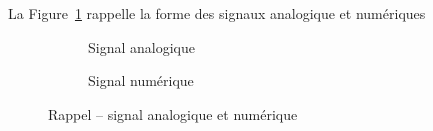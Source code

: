 La Figure~\ref{fig:analogVsNum} rappelle la forme des signaux analogique et numériques

\begin{figure}[ht]
\centering
\begin{subfigure}{0.49\textwidth}
\centering
	
	\caption{Signal analogique}
\end{subfigure}%
%
\begin{subfigure}{0.49\textwidth}
\centering
	
	\caption{Signal numérique}
\end{subfigure}
%
	\caption{Rappel -- signal analogique et numérique}
	\label{fig:analogVsNum}
\end{figure}




